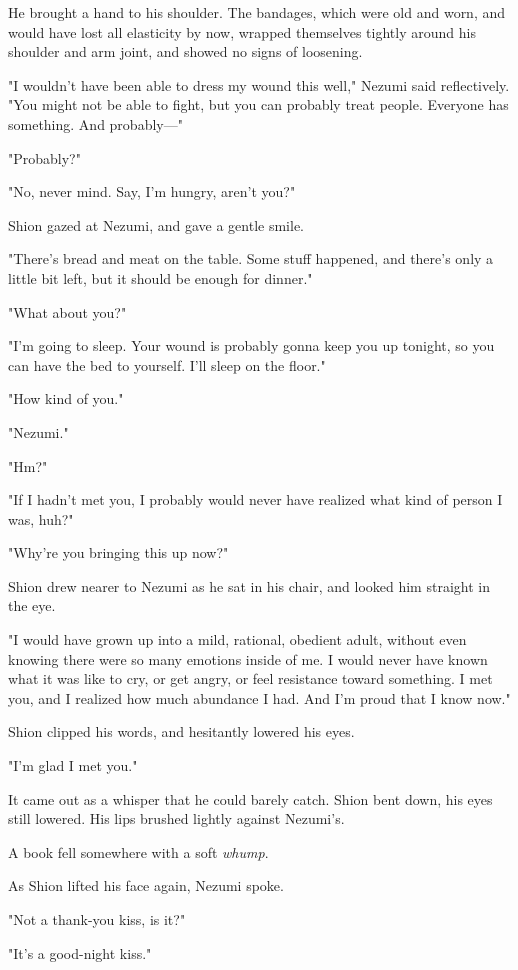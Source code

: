 He brought a hand to his shoulder. The bandages, which were old and
worn, and would have lost all elasticity by now, wrapped themselves
tightly around his shoulder and arm joint, and showed no signs of
loosening.

"I wouldn't have been able to dress my wound this well," Nezumi said
reflectively. "You might not be able to fight, but you can probably
treat people. Everyone has something. And probably---"

"Probably?"

"No, never mind. Say, I'm hungry, aren't you?"

Shion gazed at Nezumi, and gave a gentle smile.

"There's bread and meat on the table. Some stuff happened, and there's
only a little bit left, but it should be enough for dinner."

"What about you?"

"I'm going to sleep. Your wound is probably gonna keep you up tonight,
so you can have the bed to yourself. I'll sleep on the floor."

"How kind of you."

"Nezumi."

"Hm?"

"If I hadn't met you, I probably would never have realized what kind of
person I was, huh?"

"Why're you bringing this up now?"

Shion drew nearer to Nezumi as he sat in his chair, and looked him
straight in the eye.

"I would have grown up into a mild, rational, obedient adult, without
even knowing there were so many emotions inside of me. I would never
have known what it was like to cry, or get angry, or feel resistance
toward something. I met you, and I realized how much abundance I had.
And I'm proud that I know now."

Shion clipped his words, and hesitantly lowered his eyes.

"I'm glad I met you."

It came out as a whisper that he could barely catch. Shion bent down,
his eyes still lowered. His lips brushed lightly against Nezumi's.

A book fell somewhere with a soft \emph{whump}.

As Shion lifted his face again, Nezumi spoke.

"Not a thank-you kiss, is it?"

"It's a good-night kiss."

